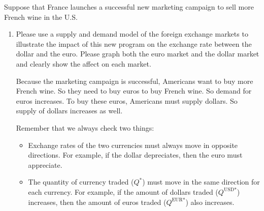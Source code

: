 \documentclass{assignment}
\begin{document}
Suppose that France launches a successful new marketing campaign to sell more French wine in the U.S.

\begin{enumerate}[resume]

\item Please use a supply and demand model of the foreign exchange markets to illustrate the impact of this new program on the exchange rate between the dollar and the euro. Please graph both the euro market and the dollar market and clearly show the affect on each market.

\begin{solution}
Because the marketing campaign is successful, Americans want to buy more French wine. So they need to buy euros to buy French wine. So demand for euros increases. To buy these euros, Americans must supply dollars. So supply of dollars increases as well.


Remember that we always check two things:
\begin{itemize}
\item Exchange rates of the two currencies must always move in opposite directions. For example, if the dollar depreciates, then the euro must appreciate.
\item The quantity of currency traded ($Q^*$) must move in the same direction for each currency. For example, if the amount of dollars traded ($Q^{\text{USD}*}$) increases, then the amount of euros traded ($Q^{\text{EUR}*}$) also increases.
\end{itemize}
\end{solution}


\end{enumerate}
\end{document}
